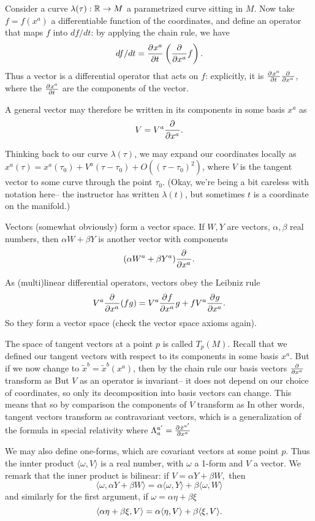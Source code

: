 Consider a curve $\lambda(\tau):\RR\to M$ a parametrized curve sitting in $M$. Now take $f=f(x^a)$ a differentiable function of the coordinates, and define an operator that maps $f$ into $df/dt$: by applying the chain rule, we have
$$df/dt=\P{x^a}{t}\left(\P{}{x^a}f\right).$$
Thus a vector is a differential operator that acts on $f$: explicitly, it is $\P{x^a}{t}\P{}{x^a}$, where the $\P{x^a}{t}$ are the components of the vector.

A general vector may therefore be written in its components in some basis $x^a$ as
$$V= V^a \P{}{x^a}.$$

Thinking back to our curve $\lambda(\tau)$, we may expand our coordinates locally as $x^a(\tau)=x^a (\tau_0)+V^a (\tau-\tau_0)+O((\tau-\tau_0)^2)$, where $V$ is the tangent vector to some curve through the point $\tau_0$. (Okay, we're being a bit careless with notation here-- the instructor has written $\lambda(t)$, but sometimes $t$ is a coordinate on the manifold.)

Vectors (somewhat obviously) form a vector space. If $W, Y$ are vectors, $\alpha,\beta$ real numbers, then $\alpha W + \beta Y$ is another vector with components
$$(\alpha W^a+\beta Y^a)\P{}{x^a}.$$

As (multi)linear differential operators, vectors obey the Leibniz rule
$$V^a \P{}{x^a}(fg)= V^a \P{f}{x^a} g+ f V^a \P{g}{x^a}.$$
So they form a vector space (check the vector space axioms again).

The space of tangent vectors at a point $p$ is called $T_p(M)$. Recall that we defined our tangent vectors with respect to its components in some basis $x^a$. But if we now change to $\tilde x^b = \tilde x^b(x^a)$, then by the chain rule our basis vectors $\P{}{x^a}$ transform as
But $V$ as an operator is invariant-- it does not depend on our choice of coordinates, so only its decomposition into basis vectors can change. This means that
so by comparison the components of $V$ transform as
In other words, tangent vectors transform as contravariant vectors, which is a generalization of the formula in special relativity where $\Lambda^{a'}_{a} = \P{\tilde x^{a'}}{x^a}$

\begin{defn}
We may also define one-forms, which are covariant vectors at some point $p$. Thus the innter product $\langle \omega, V\rangle$ is a real number, with $\omega$ a 1-form and $V$ a vector. We remark that the inner product is bilinear:
if $V=\alpha Y + \beta W,$ then
$$\langle \omega, \alpha Y + \beta W\rangle = \alpha\langle \omega, Y\rangle +\beta \langle \omega, W\rangle$$
and similarly for the first argument, if $\omega = \alpha \eta+\beta \xi$
$$\ang{\alpha \eta +\beta\xi, V} = \alpha \ang{\eta, V} +\beta \ang{\xi, V}.$$
\end{defn}

